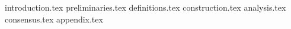 {introduction.tex}
{preliminaries.tex}
{definitions.tex}
{construction.tex}
{analysis.tex}
{consensus.tex}
{appendix.tex}